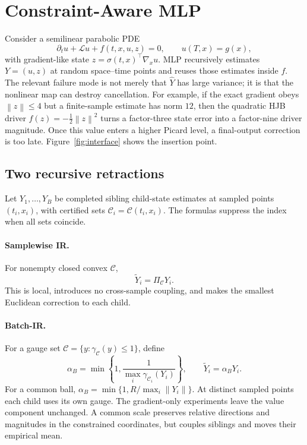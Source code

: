 \documentclass{article}
\newcommand{\norm}[1]{\left\lVert #1\right\rVert}
\begin{document}
\section{Constraint-Aware MLP}
\label{sec:method}
Consider a semilinear parabolic PDE
\begin{equation}
\partial_tu+\mathcal Lu+f(t,x,u,z)=0,\qquad u(T,x)=g(x),
\label{eq:pde}
\end{equation}
with gradient-like state $z=\sigma(t,x)^\top\nabla_xu$. MLP recursively estimates $Y=(u,z)$ at random space--time points and reuses those estimates inside $f$. The relevant failure mode is not merely that $\widehat Y$ has large variance; it is that the nonlinear map can destroy cancellation. For example, if the exact gradient obeys $\norm{z}\le 4$ but a finite-sample estimate has norm $12$, then the quadratic HJB driver $f(z)=-\tfrac12\norm z^2$ turns a factor-three state error into a factor-nine driver magnitude. Once this value enters a higher Picard level, a final-output correction is too late. Figure~\ref{fig:interface} shows the insertion point.



\subsection{Two recursive retractions}
Let $Y_1,\ldots,Y_B$ be completed sibling child-state estimates at sampled points $(t_i,x_i)$, with certified sets $\mathcal C_i=\mathcal C(t_i,x_i)$. The formulas suppress the index when all sets coincide.

\paragraph{Samplewise IR.}
For nonempty closed convex $\mathcal C$,
\begin{equation}
\widetilde Y_i=\Pi_{\mathcal C}Y_i.
\label{eq:samplewise}
\end{equation}
This is local, introduces no cross-sample coupling, and makes the smallest Euclidean correction to each child.

\paragraph{Batch-IR.}
For a gauge set $\mathcal C=\{y:\gamma_{\mathcal C}(y)\le1\}$, define
\begin{equation}
\alpha_B=\min\!\left\{1,\frac{1}{\max_i\gamma_{\mathcal C_i}(Y_i)}\right\},
\qquad \widetilde Y_i=\alpha_BY_i.
\label{eq:batch}
\end{equation}
For a common ball, $\alpha_B=\min\{1,R/\max_i\norm{Y_i}\}$. At distinct sampled points each child uses its own gauge. The gradient-only experiments leave the value component unchanged. A common scale preserves relative directions and magnitudes in the constrained coordinates, but couples siblings and moves their empirical mean.
\end{document}
